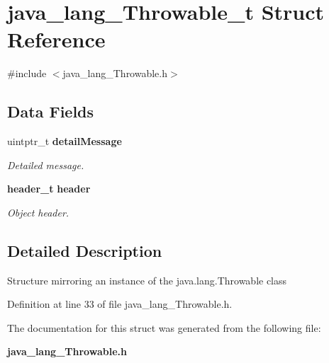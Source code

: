 \section{java\_\-lang\_\-Throwable\_\-t Struct Reference}
\label{structjava__lang___throwable__t}


{\ttfamily \#include $<$java\_\-lang\_\-Throwable.h$>$}

\subsection*{Data Fields}
\begin{DoxyCompactItemize}
\item 
uintptr\_\-t {\bf detailMessage}\label{structjava__lang___throwable__t_a8608b257069682ef3e0416d4cefc7c1c}

\begin{DoxyCompactList}\small\item\em Detailed message. \item\end{DoxyCompactList}\item 
{\bf header\_\-t} {\bf header}\label{structjava__lang___throwable__t_a0022dbb4ad8b6b28656fc54ad423e07c}

\begin{DoxyCompactList}\small\item\em Object header. \item\end{DoxyCompactList}\end{DoxyCompactItemize}


\subsection{Detailed Description}
Structure mirroring an instance of the java.lang.Throwable class 

Definition at line 33 of file java\_\-lang\_\-Throwable.h.



The documentation for this struct was generated from the following file:\begin{DoxyCompactItemize}
\item 
{\bf java\_\-lang\_\-Throwable.h}\end{DoxyCompactItemize}
